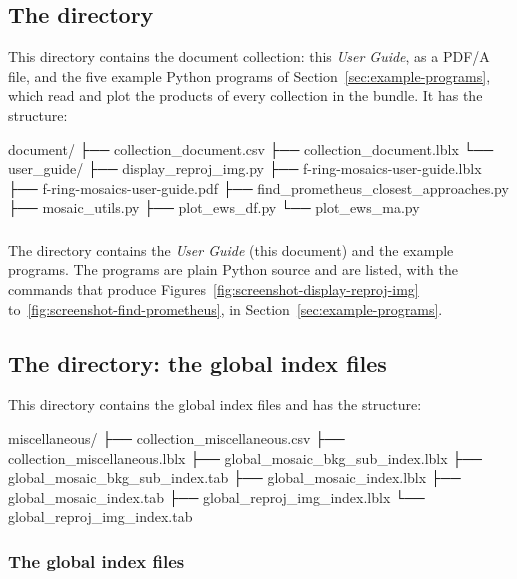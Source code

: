 \subsection{The  directory}
\label{sec:the-document-directory}

This directory contains the document collection: this \textit{User Guide}, as a PDF/A file, and the five example Python programs of Section~\ref{sec:example-programs}, which read and plot the products of every collection in the bundle. It has the structure:

\begin{CodeBlock}
document/
├── collection_document.csv
├── collection_document.lblx
└── user_guide/
    ├── display_reproj_img.py
    ├── f-ring-mosaics-user-guide.lblx
    ├── f-ring-mosaics-user-guide.pdf
    ├── find_prometheus_closest_approaches.py
    ├── mosaic_utils.py
    ├── plot_ews_df.py
    └── plot_ews_ma.py
\end{CodeBlock}


\subsubsection{}
\label{sec:user-guide}

The  directory contains the \textit{User Guide} (this document) and the example programs. The programs are plain Python source and are listed, with the commands that produce Figures~\ref{fig:screenshot-display-reproj-img} to~\ref{fig:screenshot-find-prometheus}, in Section~\ref{sec:example-programs}.


\subsection{The  directory: the global index files}
\label{sec:the-miscellaneous-directory-the-global-index-fil}

This directory contains the global index files and has the structure:

\begin{CodeBlock}
miscellaneous/
├── collection_miscellaneous.csv
├── collection_miscellaneous.lblx
├── global_mosaic_bkg_sub_index.lblx
├── global_mosaic_bkg_sub_index.tab
├── global_mosaic_index.lblx
├── global_mosaic_index.tab
├── global_reproj_img_index.lblx
└── global_reproj_img_index.tab
\end{CodeBlock}


\subsubsection{The global index files}
\label{sec:the-global-index-files}

